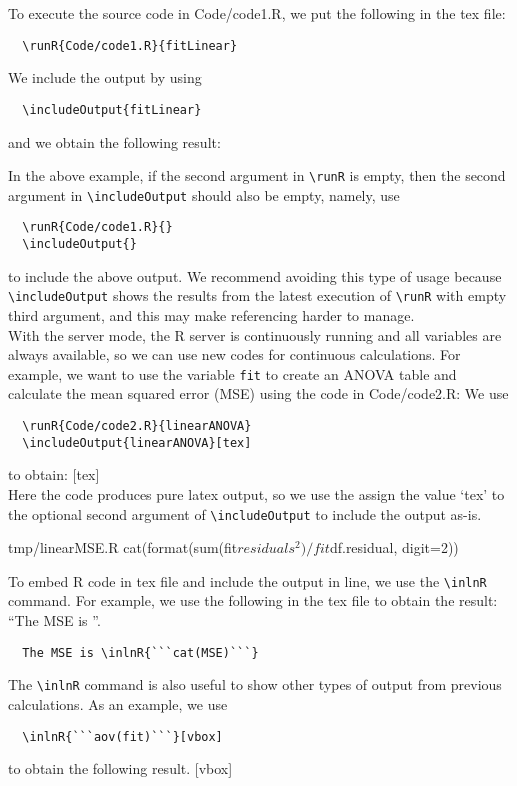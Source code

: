 \documentclass[12pt]{amsart}
\begin{document}
To execute the source code in Code/code1.R, we put the following in the tex file:
\begin{verbatim}
  \runR{Code/code1.R}{fitLinear}
\end{verbatim}
We include the output by using
\begin{verbatim}
  \includeOutput{fitLinear}
\end{verbatim}
and we obtain the following result:

In the above example, if the second argument in \verb|\runR| is empty, then the second argument in \verb|\includeOutput| should also be empty, namely, use
\begin{verbatim}
  \runR{Code/code1.R}{}
  \includeOutput{}
\end{verbatim}
to include the above output. We recommend avoiding this type of usage because \verb|\includeOutput| shows the results from the latest execution of \verb|\runR| with empty third argument, and this may make referencing harder to manage.\\

With the server mode, the R server is continuously running and all variables are always available, so we can use new codes for continuous calculations. For example, we want to use the variable \verb|fit| to create an ANOVA table and calculate the mean squared error (MSE) using the code in Code/code2.R:
We use
\begin{verbatim}
  \runR{Code/code2.R}{linearANOVA}
  \includeOutput{linearANOVA}[tex]
\end{verbatim}
to obtain:
[tex]\\
Here the code produces pure latex output, so we use the assign the value `tex' to the optional second argument of \verb|\includeOutput| to include the output as-is. \\

\begin{filecontents*}{tmp/linearMSE.R}
cat(format(sum(fit$residuals^2)/fit$df.residual, digit=2))
\end{filecontents*}
To embed R code in tex file and include the output in line, we use the \verb|\inlnR| command. For example, we use the following in the tex file to obtain the result: ``The MSE is ''.
\begin{verbatim}
  The MSE is \inlnR{```cat(MSE)```}
\end{verbatim}
The \verb|\inlnR| command is also useful to show other types of output from previous calculations. As an example, we use 
\begin{verbatim}
  \inlnR{```aov(fit)```}[vbox]
\end{verbatim}
to obtain the following result.
[vbox]
\end{document}
